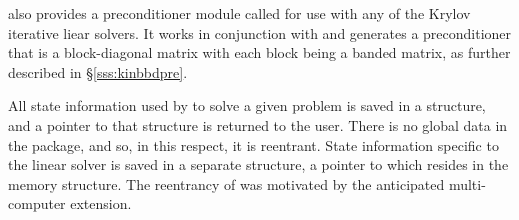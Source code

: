 {\kinsol} also provides a preconditioner module called {\kinbbdpre} for use
with any of the Krylov iterative liear solvers. It works in conjunction
with {\nvecp} and generates a preconditioner that is
a block-diagonal matrix with each block being a banded matrix, as
further described in \S\ref{sss:kinbbdpre}.

All state information used by {\kinsol} to solve a given problem is saved
in a structure, and a pointer to that structure is returned to the
user.  There is no global data in the {\kinsol} package, and so, in this
respect, it is reentrant. State information specific to the linear
solver is saved in a separate structure, a pointer to which resides in
the {\kinsol} memory structure. The reentrancy of {\kinsol} was motivated
by the anticipated multi-computer extension.
